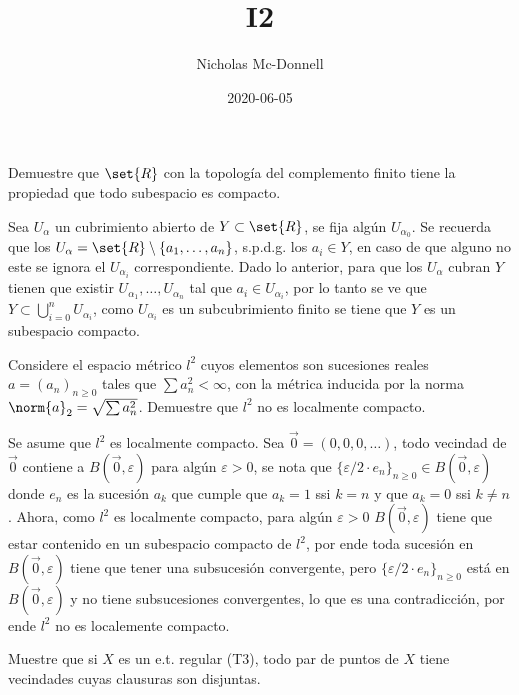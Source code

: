 \documentclass{homework}
\title{I2}
\date{2020-06-05}
\author{Nicholas Mc-Donnell}
\begin{document}
\maketitle
\newpage
{}

\begin{prob}
    Demuestre que \(\set{R}\) con la topología del complemento finito tiene la propiedad que todo subespacio es compacto.
\end{prob}

\begin{sol}
    Sea \(U_\alpha\) un cubrimiento abierto de \(Y\subset\set{R}\), se fija algún \(U_{\alpha_0}\). Se recuerda que los \(U_\alpha=\set{R}\setminus\{a_1,\dots,a_n\}\), s.p.d.g. los \(a_i\in Y\), en caso de que alguno no este se ignora el \(U_{\alpha_i}\) correspondiente. Dado lo anterior, para que los \(U_\alpha\) cubran \(Y\) tienen que existir \(U_{\alpha_1},\dots,U_{\alpha_n}\) tal que \(a_i\in U_{\alpha_i}\), por lo tanto se ve que \(Y\subset\bigcup_{i=0}^nU_{\alpha_i}\), como \(U_{\alpha_i}\) es un subcubrimiento finito se tiene que \(Y\) es un subespacio compacto.
\end{sol}

\begin{prob}
    Considere el espacio métrico \(l^2\) cuyos elementos son sucesiones reales \(a=(a_n)_{n\geq0}\) tales que \(\sum a_n^2<\infty\), con la métrica inducida por la norma \(\norm{a}_2=\sqrt{\sum a_n^2}\). Demuestre que \(l^2\) no es localmente compacto.
\end{prob}

\begin{sol}
    Se asume que \(l^2\) es localmente compacto. Sea \(\vec{0}=(0,0,0,\dots)\), todo vecindad de \(\vec{0}\) contiene a \(B(\vec{0},\varepsilon)\) para algún \(\varepsilon>0\), se nota que \(\{\varepsilon/2\cdot e_n\}_{n\geq0}\in B(\vec{0},\varepsilon)\) donde \(e_n\) es la sucesión \(a_k\) que cumple que \(a_k=1\) ssi \(k=n\) y que \(a_k=0\) ssi \(k\neq n\). Ahora, como \(l^2\) es localmente compacto, para algún \(\varepsilon>0\) \(B(\vec{0},\varepsilon)\) tiene que estar contenido en un subespacio compacto de \(l^2\), por ende toda sucesión en \(B(\vec{0},\varepsilon)\) tiene que tener una subsucesión convergente, pero \(\{\varepsilon/2\cdot e_n\}_{n\geq0}\) está en \(B(\vec{0},\varepsilon)\) y no tiene subsucesiones convergentes, lo que es una contradicción, por ende \(l^2\) no es localemente compacto.
\end{sol}

\begin{prob}
    Muestre que si \(X\) es un e.t. regular (T3), todo par de puntos de \(X\) tiene vecindades cuyas clausuras son disjuntas.
\end{prob}
\end{document}
